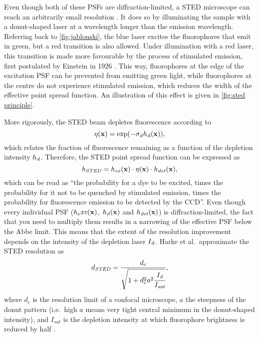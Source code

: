 Even though both of these PSFs are diffraction-limited, a STED microscope can reach an arbitrarily small resolution \cite{Wildanger2012}. It does so by illuminating the sample with a donut-shaped laser at a wavelength longer than the emission wavelength. Referring back to \autoref{fig:jablonski}, the blue laser excites the fluorophores that emit in green, but a red transition is also allowed. Under illumination with a red laser, this transition is made more favourable by the process of stimulated emission, first postulated by Einstein in 1926 \cite{Einstein1926}. This way, fluorophores at the edge of the excitation PSF can be prevented from emitting green light, while fluorophores at the centre do not experience stimulated emission, which reduces the width of the effective point spread function. An illustration of this effect is given in \autoref{fig:sted principle}.


More rigorously, the STED beam depletes fluorescence according to
\begin{equation}
	\eta(\vb{x}) = \exp(-\sigma_{\mathit{d}} h_{\mathit{d}}(\vb{x})),
\end{equation}
which relates the fraction of fluorescence remaining as a function of the depletion intensity $ h_{\mathit{d}} $. Therefore, the STED point spread function can be expressed as
\begin{equation}
	h_\mathit{STED} = h_{\mathit{ex}}(\vb{x}) \cdot \eta(\vb{x}) \cdot h_\mathit{det}(\vb{x}),
\end{equation}
which can be read as ``the probability for a dye to be excited, times the probability for it not to be quenched by stimulated emission, times the probability for fluorescence emission to be detected by the CCD''. Even though every individual PSF ($ h_exc(\vb{x}) $, $ h_{\mathit{d}}(\vb{x}) $ and $ h_\mathit{det}(\vb{x}) $) is diffraction-limited, the fact that you need to multiply them results in a narrowing of the effective PSF below the Abbe limit. This means that the extent of the resolution improvement depends on the intensity of the depletion laser $ I_{\mathit{d}}$. Harke et al.~approximate the STED resolution as
\begin{equation}
	d_\mathit{STED} = \frac{d_c}{\sqrt{1+d_c^2a^2\cfrac{I_{\mathit{d}}}{I_\mathit{sat}}}},
\end{equation}
where $ d_c $ is the resolution limit of a confocal microscope, $ a $ the steepness of the donut pattern (i.e.~high $ a $ means very tight central minimum in the donut-shaped intensity), and $ I_\mathit{sat} $ is the depletion intensity at which fluorophore brightness is reduced by half \cite{Harke2008}.

